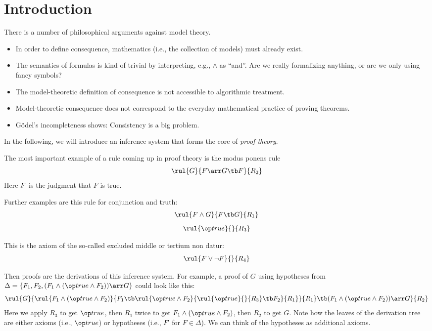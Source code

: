 \section{Introduction}

There is a number of philosophical arguments against model theory.
\begin{itemize}
\item In order to define consequence, mathematics (i.e., the collection of models) must already exist.
\item The semantics of formulas is kind of trivial by interpreting, e.g., $\wedge$ as ``and''. Are we really formalizing anything, or are we only using fancy symbols?
\item The model-theoretic definition of consequence is not accessible to algorithmic treatment.
\item Model-theoretic consequence does not correspond to the everyday mathematical practice of proving theorems.
\item G\"odel's incompleteness shows: Consistency is a big problem.
\end{itemize}

In the following, we will introduce an inference system that forms the core of \emph{proof theory}.

The most important example of a rule coming up in proof theory is the modus ponens rule
\[\rul{\der G}{\der F\arr G\tb \der F}{R_2}\]
Here $ F$ is the judgment that $F$ is true.

Further examples are this rule for conjunction and truth:
\[\rul{\der F\wedge G}{\der F\tb \der G}{R_1}\]
\[\rul{\der \true}{}{R_3}\]

This is the axiom of the so-called excluded middle or tertium non datur:
\[\rul{\der F\vee\neg F}{}{R_4}\]

Then proofs are the derivations of this inference system. For example, a proof of $G$ using hypotheses from $\Delta=\{F_1, F_2, (F_1\wedge (\true\wedge F_2))\arr G\}$ could look like this:
 \[\rul{\der G}{\rul{\der F_1\wedge (\true\wedge F_2)}{\der F_1 \tb \rul{\der \true\wedge F_2}{\rul{\der \true}{}{R_3} \tb \der F_2}{R_1}}{R_1} \tb \der(F_1\wedge (\true\wedge F_2))\arr G}{R_2}\]
Here we apply $R_3$ to get $\der \true$, then $R_1$ twice to get $\der F_1\wedge(\true\wedge F_2)$, then $R_2$ to get $G$. Note how the leaves of the derivation tree are either axioms (i.e., $\der\true$) or hypotheses (i.e., $ F$ for $F\in\Delta$). We can think of the hypotheses as additional axioms.

